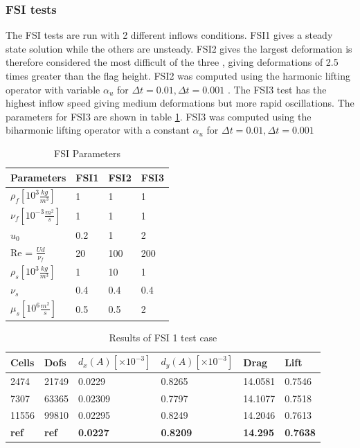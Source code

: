 \subsubsection*{FSI tests}
The FSI tests are run with 2 different inflows conditions. FSI1 gives a steady state solution while the others are unsteady. FSI2 gives the largest deformation is therefore considered the most difficult of the three \cite{Richter2013}, giving deformations of 2.5 times greater than the flag height. FSI2 was computed using the harmonic lifting operator with variable $\alpha_u$ for $\Delta t = 0.01, \Delta t = 0.001$ . The FSI3 test has the highest inflow speed giving medium deformations but more rapid oscillations. The parameters for FSI3 are shown in table \ref{FSI_para}. FSI3 was computed using the biharmonic lifting operator with a constant  $\alpha_u$ for $\Delta t = 0.01, \Delta t = 0.001$


\begin{table}[h!]
\centering
\caption{FSI Parameters}
\label{FSI_para}
\begin{tabular}{|l|l|l|l|}
\hline
Parameters & FSI1 & FSI2 & FSI3 \\ \hline
$\rho_f[10^3 \frac{kg}{m^3}]$ & 1 & 1 & 1 \\ \hline
$\nu_f [10^{-3} \frac{m^2}{s}]$ & 1 & 1 & 1 \\ \hline
$u_0$ & 0.2 & 1 & 2 \\ \hline
Re = $\frac{U d}{\nu_f}$ & 20 & 100 & 200 \\ \hline
$\rho_s[10^3 \frac{kg}{m^3}]$ & 1 & 10 & 1 \\ \hline
$\nu_s$ & 0.4 & 0.4 & 0.4 \\ \hline
$\mu_s[10^6 \frac{m^2}{s}]$ & 0.5 & 0.5 & 2 \\ \hline
\end{tabular}
\end{table}

\begin{table}[H]
\centering
\caption{Results of FSI 1 test case}
\label{my-label}
\begin{tabular}{|l|l|l|l|l|l|}
\hline
Cells & Dofs & $d_x(A) [\times10^{-3}]$ & $d_y(A)[\times10^{-3}]$ & Drag & Lift \\ \hline
2474 & 21749 & 0.0229 & 0.8265 & 14.0581 & 0.7546 \\ \hline
7307 & 63365 & 0.02309 & 0.7797 & 14.1077 & 0.7518 \\ \hline
11556 & 99810 & 0.02295 & 0.8249 & 14.2046 & 0.7613 \\ \hline
\textbf{ref} & \textbf{ref} & \textbf{0.0227} & \textbf{0.8209} & \textbf{14.295} & \textbf{0.7638} \\ \hline
\end{tabular}
\end{table}

